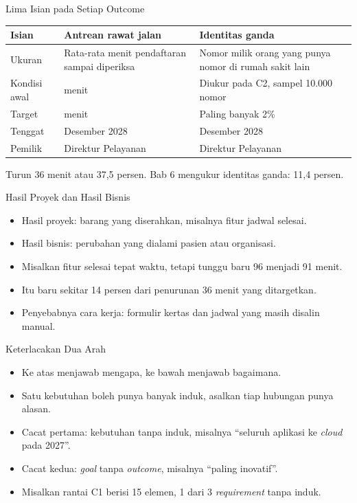 \documentclass[aspectratio=169, table, 12pt]{beamer}
\begin{document}
\begin{frame}{{\Large Lima Isian pada Setiap Outcome}}
  \footnotesize
  \begin{tabularx}{\textwidth}{>{\raggedright\arraybackslash}p{2cm}
      >{\raggedright\arraybackslash}X >{\raggedright\arraybackslash}X}
    \hline
    \textbf{Isian} & \textbf{Antrean rawat jalan} & \textbf{Identitas ganda} \\
    \hline
    Ukuran & Rata-rata menit pendaftaran sampai diperiksa & Nomor milik orang yang punya nomor di rumah sakit lain \\
    \hline
    Kondisi awal & 96 menit & Diukur pada C2, sampel 10.000 nomor \\
    \hline
    Target & 60 menit & Paling banyak 2\% \\
    \hline
    Tenggat & Desember 2028 & Desember 2028 \\
    \hline
    Pemilik & Direktur Pelayanan & Direktur Pelayanan \\
    \hline
  \end{tabularx}

  \vspace{6pt}
  {\small Turun 36 menit atau 37,5 persen. Bab 6 mengukur identitas ganda: 11,4 persen.}
\end{frame}

\begin{frame}{{\Large Hasil Proyek dan Hasil Bisnis}}
  \vspace{10pt}
  \begin{itemize}
    \item Hasil proyek: barang yang diserahkan, misalnya fitur jadwal selesai.
    \item Hasil bisnis: perubahan yang dialami pasien atau organisasi.
    \item Misalkan fitur selesai tepat waktu, tetapi tunggu baru 96 menjadi 91 menit.
    \item Itu baru sekitar 14 persen dari penurunan 36 menit yang ditargetkan.
    \item Penyebabnya cara kerja: formulir kertas dan jadwal yang masih disalin manual.
  \end{itemize}
\end{frame}

\begin{frame}{{\Large Keterlacakan Dua Arah}}
  \vspace{10pt}
  \begin{itemize}
    \item Ke atas menjawab mengapa, ke bawah menjawab bagaimana.
    \item Satu kebutuhan boleh punya banyak induk, asalkan tiap hubungan punya alasan.
    \item Cacat pertama: kebutuhan tanpa induk, misalnya ``seluruh aplikasi ke \textit{cloud}
          pada 2027''.
    \item Cacat kedua: \textit{goal} tanpa \textit{outcome}, misalnya ``paling inovatif''.
    \item Misalkan rantai C1 berisi 15 elemen, 1 dari 3 \textit{requirement} tanpa induk.
  \end{itemize}
\end{frame}
\end{document}

